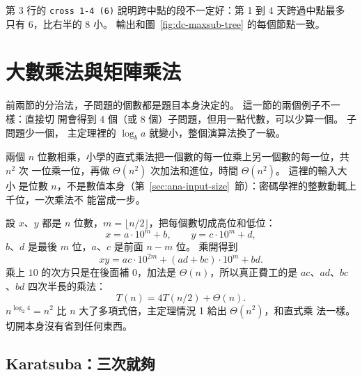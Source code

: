 
第 3 行的 \texttt{cross 1-4 (6)} 說明跨中點的段不一定好：第 1 到 4 天跨過中點最多
只有 $6$，比右半的 $8$ 小。 輸出和圖~\ref{fig:dc-maxsub-tree} 的每個節點一致。

\section{大數乘法與矩陣乘法}
\label{sec:dc-mult}

前兩節的分治法，子問題的個數都是題目本身決定的。 這一節的兩個例子不一樣：直接切
開會得到 $4$ 個（或 $8$ 個）子問題，但用一點代數，可以少算一個。 子問題少一個，
主定理裡的 $\log_b a$ 就變小，整個演算法換了一級。

兩個 $n$ 位數相乘，小學的直式乘法把一個數的每一位乘上另一個數的每一位，共 $n^2$ 次
一位乘一位，再做 $\Theta(n^2)$ 次加法和進位，時間 $\Theta(n^2)$。 這裡的輸入大小
是位數 $n$，不是數值本身（第~\ref{sec:ana-input-size}~節）：密碼學裡的整數動輒上千位，一次乘法不
能當成一步。

設 $x$、$y$ 都是 $n$ 位數，$m = \lfloor n/2 \rfloor$，把每個數切成高位和低位：
\[
x = a \cdot 10^m + b, \qquad y = c \cdot 10^m + d,
\]
$b$、$d$ 是最後 $m$ 位，$a$、$c$ 是前面 $n - m$ 位。 乘開得到
\[
xy = ac \cdot 10^{2m} + (ad + bc) \cdot 10^m + bd .
\]
乘上 $10$ 的次方只是在後面補 $0$，加法是 $\Theta(n)$，所以真正費工的是
$ac$、$ad$、$bc$、$bd$ 四次半長的乘法：
\[
T(n) = 4T(n/2) + \Theta(n).
\]
$n^{\log_2 4} = n^2$ 比 $n$ 大了多項式倍，主定理情況 1 給出 $\Theta(n^2)$，和直式乘
法一樣。 切開本身沒有省到任何東西。

\subsection{Karatsuba：三次就夠}

